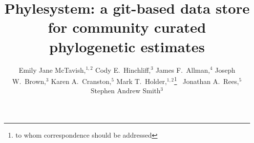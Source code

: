 \documentclass{bioinfo}
\begin{document}
\title[phylesystem git phylostore]{Phylesystem: a git-based data store for community curated phylogenetic estimates}

\author[McTavish \textit{et~al}]{
    Emily Jane McTavish,$^{1,2}$
    Cody E.~Hinchliff,${^3}$
    James F.~Allman,${^4}$
    Joseph W.~Brown,${^3}$
    Karen A.~Cranston,${^5}$
    Mark T.~Holder,$^{1,2}$\footnote{to whom correspondence should be addressed}~
    Jonathan A.~Rees,${^5}$
    Stephen Andrew Smith${^3}$
}
\address{$^{1}$Department of Ecology and Evolutionary Biology, University of Kansas, Lawrence KS, USA\\
$^{2}$Heidelberg Institute of Theoretical Studies, Heidelberg, Germany \\
$^{3}$Department of Ecology and Evolutionary Biology, University of Michigan, Ann Arbor, Michigan, USA\\
$^{4}$Interrobang Corporation, Wake Forest, North Carolina, USA\\
$^{5}$National Evolutionary Synthesis Center, Duke University, Durham, North Carolina, USA}


\maketitle
\end{document}
